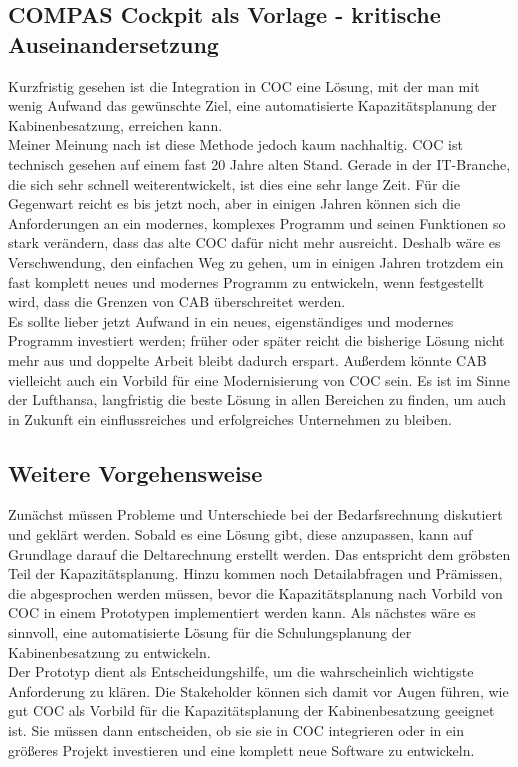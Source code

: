 \documentclass [12pt, a4paper, oneside, titlepage, ngerman]{article}
\begin{document}
\subsection{COMPAS Cockpit als Vorlage - kritische Auseinandersetzung}
Kurzfristig gesehen ist die Integration in \ac{COC} eine Lösung, mit der man mit wenig Aufwand das gewünschte Ziel, eine automatisierte Kapazitätsplanung der Kabinenbesatzung, erreichen kann.\\
Meiner Meinung nach ist diese Methode jedoch kaum nachhaltig. \ac{COC} ist technisch gesehen auf einem fast 20 Jahre alten Stand. Gerade in der IT-Branche, die sich sehr schnell weiterentwickelt, ist dies eine sehr lange Zeit. Für die Gegenwart reicht es bis jetzt noch, aber in einigen Jahren können sich die Anforderungen an ein modernes, komplexes Programm und seinen Funktionen so stark verändern, dass das alte \ac{COC} dafür nicht mehr ausreicht. Deshalb wäre es Verschwendung, den einfachen Weg zu gehen, um in einigen Jahren trotzdem ein fast komplett neues und modernes Programm zu entwickeln, wenn festgestellt wird, dass die Grenzen von \ac{CAB} überschreitet werden. \\
Es sollte lieber jetzt Aufwand in ein neues, eigenständiges und modernes Programm investiert werden; früher oder später reicht die bisherige Lösung nicht mehr aus und doppelte Arbeit bleibt dadurch erspart. Außerdem könnte \ac{CAB} vielleicht auch ein Vorbild für eine Modernisierung von \ac{COC} sein. Es ist im Sinne der Lufthansa, langfristig die beste Lösung in allen Bereichen zu finden, um auch in Zukunft ein einflussreiches und erfolgreiches Unternehmen zu bleiben.

\subsection{Weitere Vorgehensweise}
Zunächst müssen Probleme und Unterschiede bei der Bedarfsrechnung diskutiert und geklärt werden. Sobald es eine Lösung gibt, diese anzupassen, kann auf Grundlage darauf die Deltarechnung erstellt werden. Das entspricht dem gröbsten Teil der Kapazitätsplanung. Hinzu kommen noch Detailabfragen und Prämissen, die abgesprochen werden müssen, bevor die Kapazitätsplanung nach Vorbild von \ac{COC} in einem Prototypen implementiert werden kann. Als nächstes wäre es sinnvoll, eine automatisierte Lösung für die Schulungsplanung der Kabinenbesatzung zu entwickeln. \\
Der Prototyp dient als Entscheidungshilfe, um die wahrscheinlich wichtigste Anforderung zu klären. Die Stakeholder können sich damit vor Augen führen, wie gut \ac{COC} als Vorbild für die Kapazitätsplanung der Kabinenbesatzung geeignet ist. Sie müssen dann entscheiden, ob sie sie in \ac{COC} integrieren oder in ein größeres Projekt investieren und eine komplett neue Software zu entwickeln.
\end{document}
